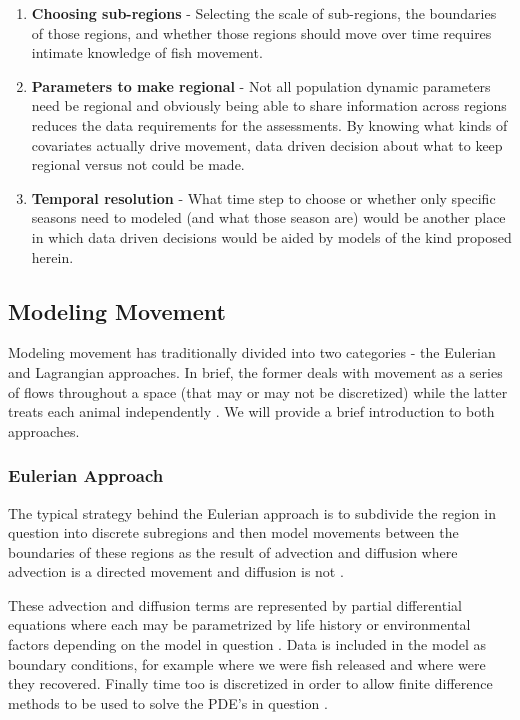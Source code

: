 \documentclass[11pt]{article}
\begin{document}
\begin{enumerate}
\item \textbf{Choosing sub-regions} - Selecting the scale of sub-regions, the boundaries of those regions, and whether those regions should move over time requires intimate knowledge of fish movement.
\item \textbf{Parameters to make regional} - Not all population dynamic parameters need be regional and obviously being able to share information across regions reduces the data requirements for the assessments. By knowing what kinds of covariates actually drive movement, data driven decision about what to keep regional versus not could be made.
\item \textbf{Temporal resolution} - What time step to choose or whether only specific seasons need to modeled (and what those season are) would be another place in which data driven decisions would be aided by models of the kind proposed herein. 
\end{enumerate}

\newpage


\subsection{Modeling Movement}\label{modeling_movement}

Modeling movement has traditionally divided into two categories - the Eulerian and Lagrangian approaches. In brief, the former deals with movement as a series of flows throughout a space (that may or may not be discretized) while the latter treats each animal independently \citep{waltersmartell}. We will provide a brief introduction to both approaches.

\subsubsection{Eulerian Approach}

The typical strategy behind the Eulerian approach is to subdivide the region in question into discrete subregions and then model movements between the boundaries of these regions as the result of advection and diffusion where advection is a directed movement and diffusion is not \citep{sibert1999} \citep{lehodey2008}. 

These advection and diffusion terms are represented by partial differential equations where each may be parametrized by life history or environmental factors depending on the model in question \citep{lehodey2008}. Data is included in the model as boundary conditions, for example where we were fish released and where were they recovered. Finally time too is discretized in order to allow finite difference methods to be used to solve the PDE's in question \citep{sibert1999}. 
\end{document}
